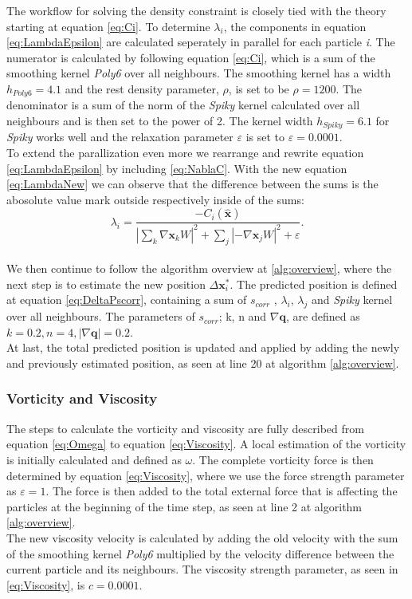The workflow for solving the density constraint is closely tied with the theory starting at equation \ref{eq:Ci}. 
To determine $\lambda_{i}$, the components in equation \ref{eq:LambdaEpsilon} are calculated seperately in parallel 
for each particle \textit{i}.
The numerator is calculated by following equation \ref{eq:Ci}, which is a sum of the smoothing kernel \textit{Poly6} over 
all neighbours. The smoothing kernel has a width $h_{Poly6} = 4.1$ and the rest density parameter, $\rho$, is set to be $\rho = 1200$. 
The denominator is a sum of the norm of the \textit{Spiky} kernel calculated over all neighbours 
and is then set to the power of 2. The kernel width $h_{Spiky} = 6.1$ for \textit{Spiky} works well and the 
relaxation parameter $\varepsilon$ is set to $\varepsilon = 0.0001$.
\\
\newline
To extend the parallization even more we rearrange and rewrite equation \ref{eq:LambdaEpsilon} by including \ref{eq:NablaC}. With the 
new equation \ref{eq:LambdaNew} we can observe that the difference between the sums is the abosolute value mark 
outside respectively inside of the sums: 
\\
\begin{equation}
\label{eq:LambdaNew}
\lambda_i = \frac{- C_i(\hat{\mathbf{x}}) }{ |\sum\limits_{k} \nabla \mathbf{x}_k W|^{2} + \sum\limits_{j} |-\nabla \mathbf{x}_j W|^2  + \varepsilon}.
\end{equation}
\\
\newline
We then continue to follow the algorithm overview at \ref{alg:overview}, where the next step is to estimate the new position $\Delta \mathbf{x}^{*}_{i}$.
The predicted position is defined at equation \ref{eq:DeltaPscorr}, containing a sum of $s_{corr}$ , $\lambda_{i}$, $\lambda_{j}$ 
and \textit{Spiky} kernel over all neighbours. 
The parameters of $s_{corr}$; k, n and $ \nabla \mathbf{q}$, are defined as $k = 0.2, n = 4, |\nabla \mathbf{q}| = 0.2$. 
\\
At last, the total predicted position is updated and applied by adding the newly and previously estimated position, 
as seen at line 20 at algorithm \ref{alg:overview}.

\subsubsection{Vorticity and Viscosity}
The steps to calculate the vorticity and viscosity are fully described from equation \ref{eq:Omega} to equation \ref{eq:Viscosity}.
A local estimation of the vorticity is initially calculated and defined as $\omega$. The complete vorticity force is then determined 
by equation \ref{eq:Viscosity}, where we use the force strength parameter as $\varepsilon = 1$. The force is then added to the total 
external force that is affecting the particles at the beginning of the time step, as seen at line 2 at algorithm \ref{alg:overview}. 
\\
The new viscosity velocity is calculated by adding the old velocity with the sum of the smoothing kernel \textit{Poly6} multiplied by the velocity difference between 
the current particle and its neighbours. The viscosity strength parameter, as seen in \ref{eq:Viscosity}, is $c = 0.0001$. 